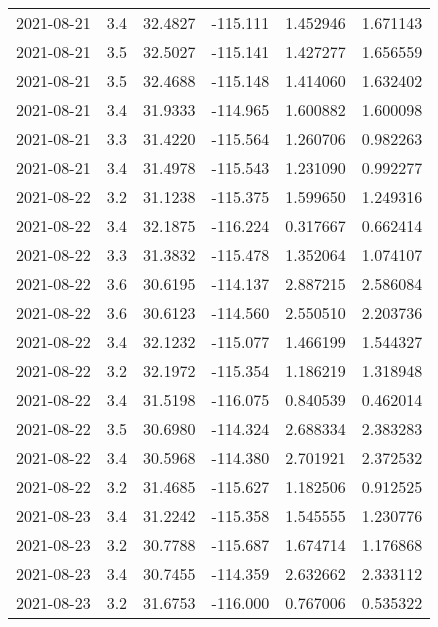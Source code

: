 \begin{tabular}{lrrrrr}
2021-08-21 &       3.4 &  32.4827 &  -115.111 &         1.452946 &         1.671143 \\
2021-08-21 &       3.5 &  32.5027 &  -115.141 &         1.427277 &         1.656559 \\
2021-08-21 &       3.5 &  32.4688 &  -115.148 &         1.414060 &         1.632402 \\
2021-08-21 &       3.4 &  31.9333 &  -114.965 &         1.600882 &         1.600098 \\
2021-08-21 &       3.3 &  31.4220 &  -115.564 &         1.260706 &         0.982263 \\
2021-08-21 &       3.4 &  31.4978 &  -115.543 &         1.231090 &         0.992277 \\
2021-08-22 &       3.2 &  31.1238 &  -115.375 &         1.599650 &         1.249316 \\
2021-08-22 &       3.4 &  32.1875 &  -116.224 &         0.317667 &         0.662414 \\
2021-08-22 &       3.3 &  31.3832 &  -115.478 &         1.352064 &         1.074107 \\
2021-08-22 &       3.6 &  30.6195 &  -114.137 &         2.887215 &         2.586084 \\
2021-08-22 &       3.6 &  30.6123 &  -114.560 &         2.550510 &         2.203736 \\
2021-08-22 &       3.4 &  32.1232 &  -115.077 &         1.466199 &         1.544327 \\
2021-08-22 &       3.2 &  32.1972 &  -115.354 &         1.186219 &         1.318948 \\
2021-08-22 &       3.4 &  31.5198 &  -116.075 &         0.840539 &         0.462014 \\
2021-08-22 &       3.5 &  30.6980 &  -114.324 &         2.688334 &         2.383283 \\
2021-08-22 &       3.4 &  30.5968 &  -114.380 &         2.701921 &         2.372532 \\
2021-08-22 &       3.2 &  31.4685 &  -115.627 &         1.182506 &         0.912525 \\
2021-08-23 &       3.4 &  31.2242 &  -115.358 &         1.545555 &         1.230776 \\
2021-08-23 &       3.2 &  30.7788 &  -115.687 &         1.674714 &         1.176868 \\
2021-08-23 &       3.4 &  30.7455 &  -114.359 &         2.632662 &         2.333112 \\
2021-08-23 &       3.2 &  31.6753 &  -116.000 &         0.767006 &         0.535322 \\

\end{tabular}
